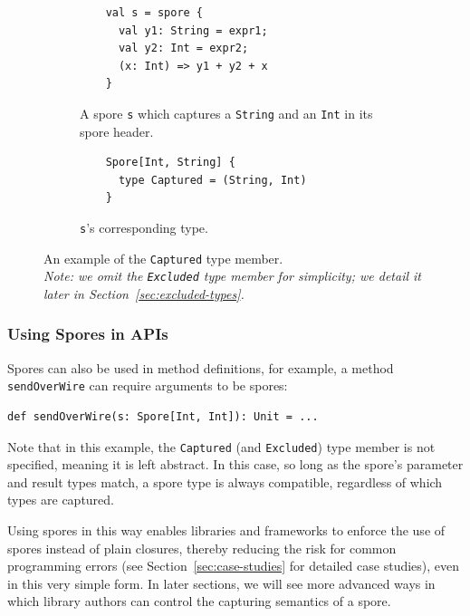 \documentclass{llncs}
\begin{document}
\begin{figure}[t!]
\begin{subfigure}{.5\textwidth}
  \centering
  \begin{lstlisting}
    val s = spore {
      val y1: String = expr1;
      val y2: Int = expr2;
      (x: Int) => y1 + y2 + x
    }
  \end{lstlisting}
  \caption{A spore \texttt{s} which captures a \texttt{String} and an \texttt{Int} in its spore header.}
  \label{fig:captured-spore}
\end{subfigure}%
\begin{subfigure}{.5\textwidth}
  \centering
  \begin{lstlisting}
    Spore[Int, String] {
      type Captured = (String, Int)
    }
  \end{lstlisting}
  \caption{\texttt{s}'s corresponding type.}
  \label{fig:captured-type}
\end{subfigure}%
\vspace{1mm}
\caption{An example of the \texttt{Captured} type member. \\\textit{Note: we omit the
\texttt{Excluded} type member for simplicity; we detail it later in Section~\ref{sec:excluded-types}.}}
\label{fig:captured-ex}
\vspace{-5mm}
\end{figure}

\subsubsection{Using Spores in APIs}

Spores can also be used in method definitions, for example, a method \verb|sendOverWire| can require arguments to be spores:

\begin{lstlisting}[numbers=none]
    def sendOverWire(s: Spore[Int, Int]): Unit = ...
\end{lstlisting}

\noindent Note that in this example, the \verb|Captured| (and \verb|Excluded|) type
member is not specified, meaning it is left abstract. In this case, so long as
the spore's parameter and result types match, a spore type is always
compatible, regardless of which types are captured.

Using spores in this way enables libraries and frameworks to enforce the use
of spores instead of plain closures, thereby reducing the risk for common
programming errors (see Section~\ref{sec:case-studies} for detailed case
studies), even in this very simple form. In later sections, we will see more
advanced ways in which library authors can control the capturing semantics of
a spore.
\end{document}

